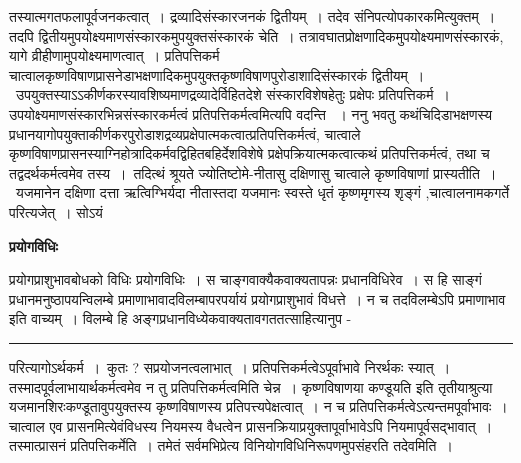 \documentclass[11pt, openany]{book}
\begin{document}
तस्यात्मगतफलापूर्वजनकत्वात्~। द्रव्यादिसंस्कारजनकं द्वितीयम्~। तदेव संनिपत्योपकारकमित्युक्तम्~। तदपि द्वितीयमुपयोक्ष्यमाणसंस्कारकमुपयुक्तसंस्कारकं चेति~।
तत्रावघातप्रोक्षणादिकमुपयोक्ष्यमाणसंस्कारकं, यागे व्रीहीणामुपयोक्ष्यमाणत्वात्~। प्रतिपत्तिकर्म चात्वालकृष्णविषाणप्रासनेडाभक्षणादिकमुपयुक्तकृष्णविषाणपुरोडाशादिसंस्कारकं द्वितीयम्~।~उपयुक्तस्याऽऽकीर्णकरस्यावशिष्यमाणद्रव्यादेर्विहितदेशे
संस्कारविशेषहेतुः प्रक्षेपः प्रतिपत्तिकर्म~। उपयोक्ष्यमाणसंस्कारभिन्नसंस्कारकर्मत्वं प्रतिपत्तिकर्मत्वमित्यपि वदन्ति
~। {\br ननु} भवतु कथंचिदिडाभक्षणस्य प्रधानयागोपयुक्ताकीर्णकरपुरोडाशद्रव्यप्रक्षेपात्मकत्वात्प्रतिपत्तिकर्मत्वं, चात्वाले कृष्णविषाणप्रासनस्याग्निहोत्रादिकर्मवद्विहितबहिर्देशविशेषे प्रक्षेपक्रियात्मकत्वात्कथं प्रतिपत्तिकर्मत्वं, तथा च तद्वदर्थकर्मत्वमेव तस्य~।~तदित्थं श्रूयते ज्योतिष्टोमे-नीतासु दक्षिणासु चात्वाले कृष्णविषाणां प्रास्यतीति~।~यजमानेन दक्षिणा दत्ता ऋत्विग्भिर्यदा नीतास्तदा यजमानः स्वस्ते धृतं कृष्णमृगस्य शृङ्गं ,चात्वालनामकगर्ते परित्यजेत्~। सोऽयं
\newpage
\fancyhead[RE]{[ प्रयोग\textemdash\ }
\begin{center}
 \textbf{प्रयोगविधिः}   
\end{center}
 
{\bl प्रयोगप्राशुभावबोधको विधिः प्रयोगविधिः~। स चाङ्गवाक्यैकवाक्यतापन्नः प्रधानविधिरेव~। स हि साङ्गं प्रधानमनुष्ठापयन्विलम्बे प्रमाणाभावादविलम्बापरपर्यायं प्रयोगप्राशुभावं विधत्ते~। न च तदविलम्बेऽपि प्रमाणाभाव इति वाच्यम्~। विलम्बे हि अङ्गप्रधानविध्येकवाक्यतावगततत्साहित्यानुप -\\} 
\hrule
\vspace{3mm}
\noindent
परित्यागोऽर्थकर्म~।~कुतः ? सप्रयोजनत्वलाभात्~। प्रतिपत्तिकर्मत्वेऽपूर्वाभावे निरर्थकः स्यात्~। तस्मादपूर्वलाभायार्थकर्मत्वमेव न तु प्रतिपत्तिकर्मत्वमिति चेन्न~। {\qt कृष्णविषाणया कण्डूयति} इति तृतीयाश्रुत्या यजमानशिरःकण्डूतावुपयुक्तस्य कृष्णविषाणस्य प्रतिपत्त्यपेक्षत्वात्~। न च प्रतिपत्तिकर्मत्वेऽत्यन्तमपूर्वाभावः~। चात्वाल एव प्रासनमित्येवंविधस्य नियमस्य वैधत्वेन प्रासनक्रियाप्रयुक्तापूर्वाभावेऽपि नियमापूर्वसद्भावात्~। तस्मात्प्रासनं प्रतिपत्तिकर्मेति~। तमेतं सर्वमभिप्रेत्य विनियोगविधिनिरूपणमुपसंहरति {\br तदेवमिति~।}\\
\end{document}
